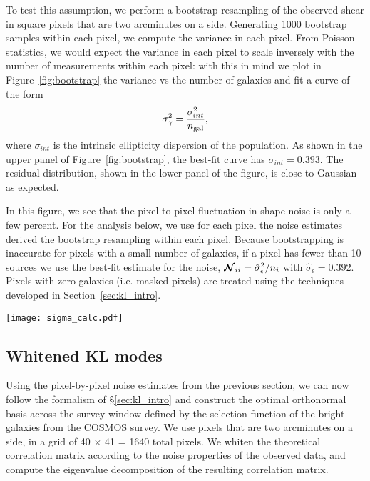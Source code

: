To test this assumption, we perform a bootstrap resampling of the observed
shear in square pixels that are two arcminutes on a side.
Generating 1000 bootstrap samples within each
pixel, we compute the variance in each pixel.
From Poisson statistics, we would expect the variance in each pixel to
scale inversely with the number of measurements within each pixel: with this
in mind we plot in Figure~\ref{fig:bootstrap}
the variance vs the number of galaxies and fit a curve of the form 
\begin{equation}
  \sigma_\gamma^2 = \frac{\sigma_{int}^2}{n_{\rm gal}},
\end{equation}
where $\sigma_{int}$ is the intrinsic ellipticity dispersion of the population.
As shown in the upper panel of Figure~\ref{fig:bootstrap}, the best-fit
curve has $\sigma_{int} = 0.393$.  The residual distribution, shown in the
lower panel of the figure, is close to Gaussian as expected.

In this figure, we see that the pixel-to-pixel fluctuation in shape noise
is only a few percent.  For the analysis below, we use for each pixel
the noise estimates derived the bootstrap resampling within each pixel.
Because bootstrapping is inaccurate
for pixels with a small number of galaxies, if a pixel has fewer than 10
sources we use the best-fit estimate for the noise,
$\boldsymbol{\mathcal{N}}_{ii} = \hat{\sigma}_\epsilon^2 / n_i$
with $\hat{\sigma}_\epsilon = 0.392$.  Pixels with zero galaxies (i.e.
masked pixels) are treated using the techniques developed in
Section~\ref{sec:kl_intro}.

\begin{figure*}
 \centering
 \texttt{[image: sigma\_calc.pdf]}
 \caption[Bootstrap estimates of the shape noise]
 {Bootstrap estimates of the shape noise for each pixel.  The estimates
   reflect an intrinsic ellipticity of $0.393 \pm 0.013$.
   \label{fig:bootstrap}}
\end{figure*}

\subsection{Whitened KL modes}
Using the pixel-by-pixel noise estimates from the previous section, we can
now follow the formalism of \S\ref{sec:kl_intro} and construct the optimal
orthonormal basis across the survey window defined by the selection function
of the bright galaxies from the COSMOS survey.  We use pixels that are
two arcminutes on a side, in a grid of 40 $\times$ 41 = 1640 total
pixels.  We whiten the theoretical correlation matrix according to the noise
properties of the observed data, and compute the eigenvalue decomposition
of the resulting correlation matrix.

